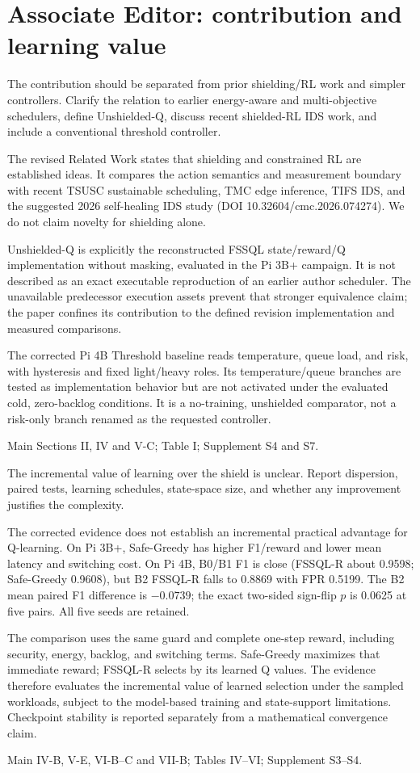 \documentclass[10pt,a4paper]{article}
\newcommand{\commentbox}[1]{\begin{rcommentbox}#1\end{rcommentbox}}
\newcommand{\responsebox}[1]{\begin{authorresponsebox}#1\end{authorresponsebox}}
\newcommand{\changebox}[1]{\begin{wherebox}#1\end{wherebox}}
\begin{document}
\section*{Associate Editor: contribution and learning value}
\commentbox{The contribution should be separated from prior shielding/RL work and simpler controllers. Clarify the relation to earlier energy-aware and multi-objective schedulers, define Unshielded-Q, discuss recent shielded-RL IDS work, and include a conventional threshold controller.}
\responsebox{The revised Related Work states that shielding and constrained RL are established ideas. It compares the action semantics and measurement boundary with recent TSUSC sustainable scheduling, TMC edge inference, TIFS IDS, and the suggested 2026 self-healing IDS study (DOI 10.32604/cmc.2026.074274). We do not claim novelty for shielding alone.

Unshielded-Q is explicitly the reconstructed FSSQL state/reward/Q implementation without masking, evaluated in the Pi 3B+ campaign. It is not described as an exact executable reproduction of an earlier author scheduler. The unavailable predecessor execution assets prevent that stronger equivalence claim; the paper confines its contribution to the defined revision implementation and measured comparisons.

The corrected Pi 4B Threshold baseline reads temperature, queue load, and risk, with hysteresis and fixed light/heavy roles. Its temperature/queue branches are tested as implementation behavior but are not activated under the evaluated cold, zero-backlog conditions. It is a no-training, unshielded comparator, not a risk-only branch renamed as the requested controller.}
\changebox{Main Sections II, IV and V-C; Table I; Supplement S4 and S7.}
\commentbox{The incremental value of learning over the shield is unclear. Report dispersion, paired tests, learning schedules, state-space size, and whether any improvement justifies the complexity.}
\responsebox{The corrected evidence does not establish an incremental practical advantage for Q-learning. On Pi 3B+, Safe-Greedy has higher F1/reward and lower mean latency and switching cost. On Pi 4B, B0/B1 F1 is close (FSSQL-R about 0.9598; Safe-Greedy 0.9608), but B2 FSSQL-R falls to 0.8869 with FPR 0.5199. The B2 mean paired F1 difference is $-0.0739$; the exact two-sided sign-flip $p$ is 0.0625 at five pairs. All five seeds are retained.

The comparison uses the same guard and complete one-step reward, including security, energy, backlog, and switching terms. Safe-Greedy maximizes that immediate reward; FSSQL-R selects by its learned Q values. The evidence therefore evaluates the incremental value of learned selection under the sampled workloads, subject to the model-based training and state-support limitations. Checkpoint stability is reported separately from a mathematical convergence claim.}
\changebox{Main IV-B, V-E, VI-B--C and VII-B; Tables IV--VI; Supplement S3--S4.}
\end{document}
